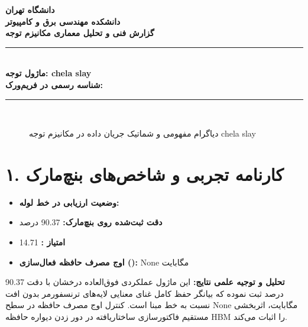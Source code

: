 \documentclass[12pt,a4paper]{article}
\begin{document}
\begin{center}
{\Large\bfseries دانشگاه تهران}\\[0.2cm]
{\large\bfseries دانشکده مهندسی برق و کامپیوتر}\\[0.2cm]
{\large\bfseries گزارش فنی و تحلیل معماری مکانیزم توجه}\\[0.5cm]
\rule{\linewidth}{1pt}\\[0.3cm]
{\LARGE\bfseries ماژول توجه: chela slay}\\[0.2cm]
{\large \textbf{شناسه رسمی در فریم‌ورک:} }\\[0.2cm]
\rule{\linewidth}{1pt}\\[0.5cm]
\end{center}

\begin{figure}[H]
\centering
{}
\caption{دیاگرام مفهومی و شماتیک جریان داده در مکانیزم توجه chela slay}
\end{figure}

\section*{۱. کارنامه تجربی و شاخص‌های بنچ‌مارک}
\begin{itemize}
\item \textbf{وضعیت ارزیابی در خط لوله:} 
\item \textbf{دقت ثبت‌شده روی بنچ‌مارک:} 90.37 درصد
\item \textbf{امتیاز :} 14.71
\item \textbf{اوج مصرف حافظه فعال‌سازی ():} None مگابایت
\end{itemize}
\textbf{تحلیل و توجیه علمی نتایج:} این ماژول عملکردی فوق‌العاده درخشان با دقت 90.37 درصد ثبت نموده که بیانگر حفظ کامل غنای معنایی لایه‌های ترنسفورمر بدون افت نسبت به خط مبنا است. کنترل اوج مصرف حافظه در سطح None مگابایت، اثربخشی مستقیم فاکتورسازی ساختاریافته در دور زدن دیواره حافظه HBM را اثبات می‌کند.
\end{document}
